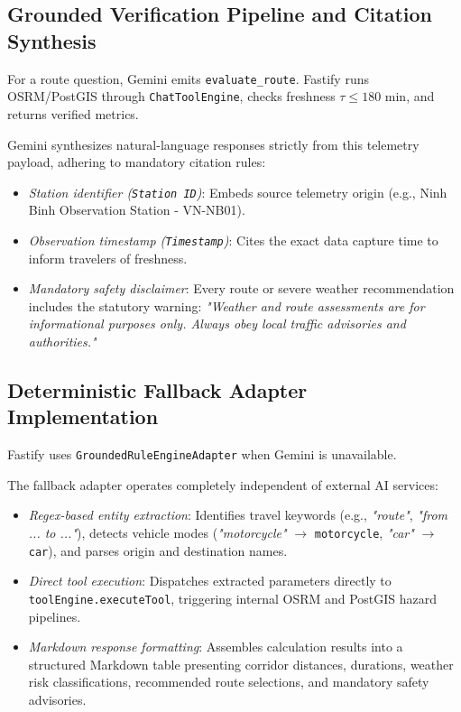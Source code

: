 \subsection{Grounded Verification Pipeline and Citation Synthesis}
For a route question, Gemini emits \texttt{evaluate\_route}. Fastify runs OSRM/PostGIS through \texttt{ChatToolEngine}, checks freshness $\tau \le 180\text{ min}$, and returns verified metrics.

Gemini synthesizes natural-language responses strictly from this telemetry payload, adhering to mandatory citation rules:
\begin{itemize}
    \item[-] \textit{Station identifier (\texttt{Station ID})}: Embeds source telemetry origin (e.g., Ninh Binh Observation Station - VN-NB01).
    \item[-] \textit{Observation timestamp (\texttt{Timestamp})}: Cites the exact data capture time to inform travelers of freshness.
    \item[-] \textit{Mandatory safety disclaimer}: Every route or severe weather recommendation includes the statutory warning: \textit{"Weather and route assessments are for informational purposes only. Always obey local traffic advisories and authorities."}
\end{itemize}

\subsection{Deterministic Fallback Adapter Implementation}
Fastify uses \texttt{GroundedRuleEngineAdapter} when Gemini is unavailable.

The fallback adapter operates completely independent of external AI services:
\begin{itemize}
    \item[-] \textit{Regex-based entity extraction}: Identifies travel keywords (e.g., \textit{"route"}, \textit{"from ... to ..."}), detects vehicle modes (\textit{"motorcycle"} $\to$ \texttt{motorcycle}, \textit{"car"} $\to$ \texttt{car}), and parses origin and destination names.
    \item[-] \textit{Direct tool execution}: Dispatches extracted parameters directly to \texttt{toolEngine.}\allowbreak\texttt{executeTool}, triggering internal OSRM and PostGIS hazard pipelines.
    \item[-] \textit{Markdown response formatting}: Assembles calculation results into a structured Markdown table presenting corridor distances, durations, weather risk classifications, recommended route selections, and mandatory safety advisories.
\end{itemize}

